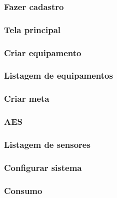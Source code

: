 \subsubsection{Fazer cadastro}
\subsubsection{Tela principal}
\subsubsection{Criar equipamento}
\subsubsection{Listagem de equipamentos}
\subsubsection{Criar meta}
\subsubsection{AES}
\subsubsection{Listagem de sensores}
\subsubsection{Configurar sistema}
\subsubsection{Consumo}
